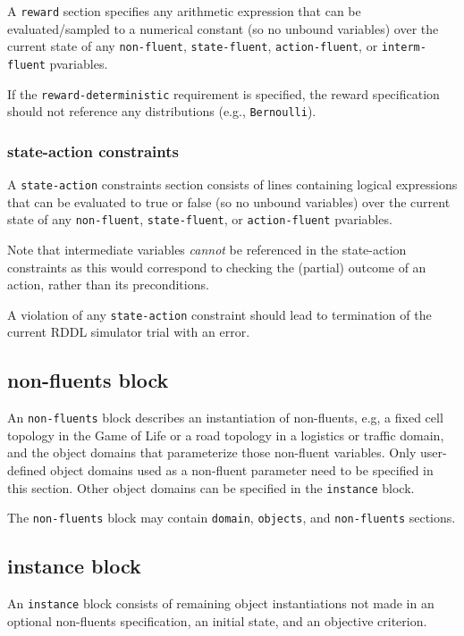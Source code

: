 \documentclass[11pt,a4paper]{article}
\begin{document}
A \texttt{reward} section specifies any arithmetic expression
that can be evaluated/sampled to a numerical constant 
(so no unbound variables) over the current state of any
\texttt{non-fluent}, \texttt{state-fluent}, \texttt{action-fluent},
or \texttt{interm-fluent} pvariables.

If the \texttt{reward-deterministic} requirement is specified,
the reward specification should not reference any distributions
(e.g., \texttt{Bernoulli}).

\subsubsection{state-action constraints}

A \texttt{state-action} constraints section consists of lines
containing logical expressions that can be evaluated to true or false
(so no unbound variables) over the current state of any
\texttt{non-fluent}, \texttt{state-fluent}, or \texttt{action-fluent}
pvariables.

Note that intermediate variables \emph{cannot} be
referenced in the state-action constraints as this would correspond to
checking the (partial) outcome of an action, rather than its
preconditions.

A violation of any \texttt{state-action} constraint should
lead to termination of the current RDDL simulator trial with
an error.

\subsection{non-fluents block}

An \texttt{non-fluents} block describes an instantiation of
non-fluents, e.g, a fixed cell topology in the Game of Life or
a road topology in a logistics or traffic domain, and the
object domains that parameterize those non-fluent variables.
Only user-defined object domains used as a non-fluent parameter
need to be specified in this section.  Other object domains
can be specified in the \texttt{instance} block.

The \texttt{non-fluents} block may contain \texttt{domain},
\texttt{objects}, and \texttt{non-fluents} sections.

\subsection{instance block}

An \texttt{instance} block consists of remaining object instantiations
not made in an optional non-fluents specification,
an initial state, and an objective criterion.
\end{document}
